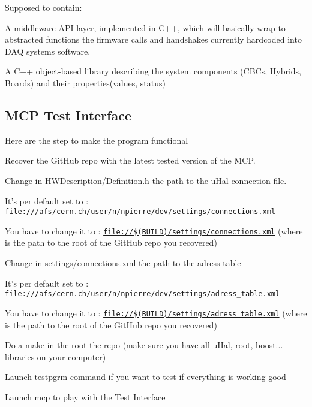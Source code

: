 Supposed to contain\-:


\begin{DoxyItemize}
\item A middleware A\-P\-I layer, implemented in C++, which will basically wrap to abstracted functions the firmware calls and handshakes currently hardcoded into D\-A\-Q systems software.
\item A C++ object-\/based library describing the system components (C\-B\-Cs, Hybrids, Boards) and their properties(values, status)
\end{DoxyItemize}

\subsection*{M\-C\-P Test Interface }

Here are the step to make the program functional


\begin{DoxyEnumerate}
\item Recover the Git\-Hub repo with the latest tested version of the M\-C\-P.
\item Change in \hyperlink{_definition_8h}{H\-W\-Description/\-Definition.\-h} the path to the u\-Hal connection file.
\begin{DoxyItemize}
\item It's per default set to \-: \href{file:///afs/cern.ch/user/n/npierre/dev/settings/connections.xml}{\tt file\-:///afs/cern.\-ch/user/n/npierre/dev/settings/connections.\-xml}
\item You have to change it to \-: \href{file://$(BUILD)/settings/connections.xml}{\tt file\-://\$(\-B\-U\-I\-L\-D)/settings/connections.\-xml} (where  is the path to the root of the Git\-Hub repo you recovered)
\end{DoxyItemize}
\item Change in settings/connections.\-xml the path to the adress table
\begin{DoxyItemize}
\item It's per default set to \-: \href{file:///afs/cern.ch/user/n/npierre/dev/settings/adress_table.xml}{\tt file\-:///afs/cern.\-ch/user/n/npierre/dev/settings/adress\-\_\-table.\-xml}
\item You have to change it to \-: \href{file://$(BUILD)/settings/adress_table.xml}{\tt file\-://\$(\-B\-U\-I\-L\-D)/settings/adress\-\_\-table.\-xml} (where  is the path to the root of the Git\-Hub repo you recovered)
\end{DoxyItemize}
\item Do a make in the root the repo (make sure you have all u\-Hal, root, boost... libraries on your computer)
\item Launch testpgrm command if you want to test if everything is working good
\item Launch mcp to play with the Test Interface
\end{DoxyEnumerate}

